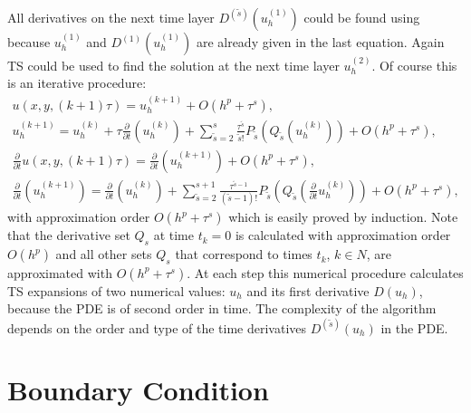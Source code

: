 \documentclass[11pt,a4paper,twoside]{article}
\begin{document}
All derivatives on the next time layer $D^{(\tilde s) }( u_h^{(1)} )$ could be found using  because $u_h^{(1)}$ and $D^{(1) }( u_h^{(1)} )$
are already given in the last equation. Again TS could be used to find the solution at the next time layer $u_h^{(2)}$. Of course this is an iterative procedure:
\begin{align*}\label{Taylor}
u(x,y,(k+1)\tau) = u_h^{(k+1)} + O(h^p + \tau^s),
\\
u_h^{(k+1)} = u_h^{(k)} + \tau \frac{\partial}{\partial t}(u_h^{(k)}) + \sum_{ \tilde s = 2 }^{ s } \frac{ \tau^{\tilde s}}{\tilde s!} P_{\tilde s}( Q_{\tilde s}( u_h^{(k)} ) ) + O(h^p + \tau^s),
\\  
\frac{\partial}{\partial t}u(x,y,(k+1)\tau) = \frac{\partial}{\partial t}( u_h^{(k+1)}) + O(h^p + \tau^s),
\\
\frac{\partial}{\partial t}( u_h^{(k+1)}) = \frac{\partial}{\partial t}( u_h^{(k)}) + \sum_{ \tilde s = 2 }^{ s + 1 } \frac{ \tau^{\tilde s - 1}}{(\tilde s-1)!} P_{\tilde s}( Q_{\tilde s}( \frac{\partial}{\partial t} u_h^{(k)} ) )+ O(h^p + \tau^s),
\end{align*}
with approximation order $O(h^p + \tau^s)$ which is easily proved by induction. Note that the derivative set $Q_s$ at time $t_k = 0$ is calculated with approximation order $O(h^p)$ and all other sets $Q_s$ that correspond to times $t_k$, $k \in N$, are approximated with $O(h^p + \tau^s)$. At each step this numerical procedure calculates TS expansions of two numerical values: $u_h$ and its first derivative $D(u_h)$, because the PDE is of second order in time. The complexity of the algorithm depends on the order and type of the time derivatives $D^{(\tilde s)}(u_h)$ in the PDE.

\section{Boundary Condition}\label{BndS}
\end{document}
